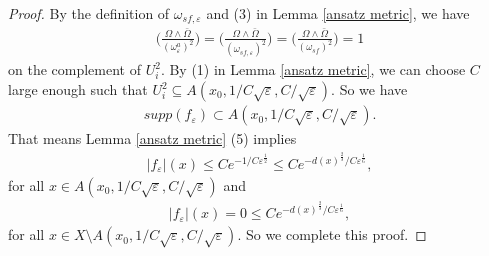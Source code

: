 \documentclass[10pt,a4paper]{amsart}
\renewcommand{\epsilon}{\varepsilon}
\renewcommand{\leq}{\leqslant}
\begin{document}
\begin{proof}
By the definition of $\omega_{sf,\varepsilon}$ and (3) in Lemma \ref{ansatz metric}, we have
\begin{align}
\bigg( \frac{\Omega\wedge \bar{\Omega}}{({\omega}^a_{\epsilon})^2}\bigg)=\bigg( \frac{\Omega\wedge \bar{\Omega}}{({\omega}_{sf,\epsilon})^2}\bigg)=\bigg( \frac{\Omega\wedge \bar{\Omega}}{({\omega}_{sf})^2}\bigg)=1
\end{align}
on the complement of $U^2_i$. By (1) in Lemma \ref{ansatz metric}, we can choose $C$ large enough such that $U^2_i\subseteq A( x_0,1/C\sqrt{\varepsilon}, C/\sqrt{\varepsilon})$. So we have
\begin{align}
supp(f_{\varepsilon})\subset A( x_0,1/C\sqrt{\varepsilon}, C/\sqrt{\varepsilon}).
\end{align}
That means Lemma \ref{ansatz metric} (5) implies
\begin{align}
|f_{\varepsilon}|(x)\leq Ce^{-1/C\epsilon^{\frac{1}{2}}}\leq Ce^{-d(x)^{\frac{2}{3}}/C\epsilon^{\frac{1}{6}}},
\end{align}
for all $x\in A( x_0,1/C\sqrt{\varepsilon}, C/\sqrt{\varepsilon})$ and
\begin{align}
|f_{\varepsilon}|(x)=0\leq Ce^{-d(x)^{\frac{2}{3}}/C\epsilon^{\frac{1}{6}}},
\end{align}
for all $x\in X\setminus A( x_0,1/C\sqrt{\varepsilon}, C/\sqrt{\varepsilon})$. So we complete this proof.
\end{proof}
\end{document}
